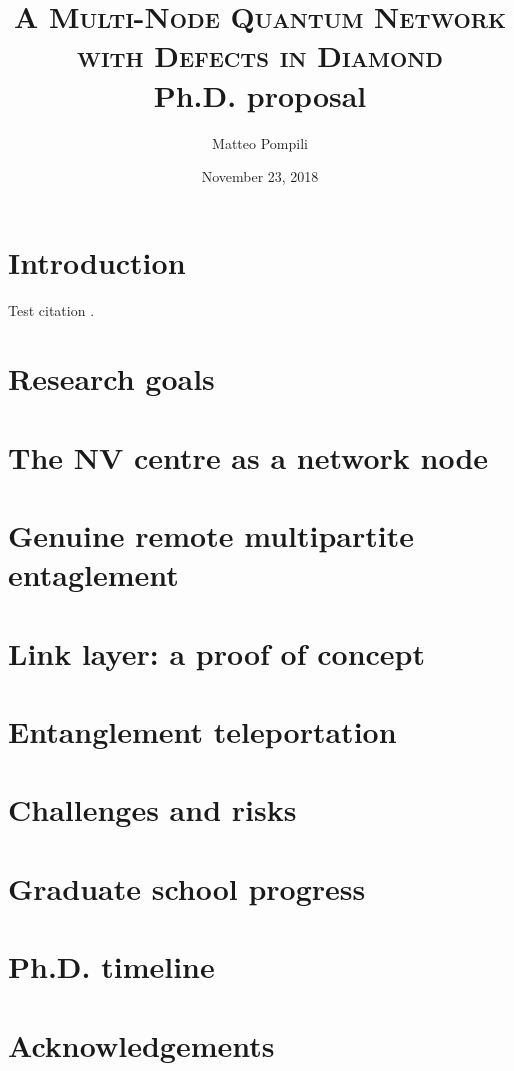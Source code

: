\documentclass[]{article}
\title{
	\huge{\textsc{A Multi-Node Quantum Network \\with Defects in Diamond}}\\
	\vspace{10pt}\Large{Ph.D. proposal}
}
\author{Matteo Pompili}
\date{November 23, 2018}
\begin{document}
\maketitle

\section*{Introduction}
Test citation \cite{Humphreys2018}.

\tableofcontents

\section{Research goals}

\section{The NV centre as a network node}

\section{Genuine remote multipartite entaglement}

\section{Link layer: a proof of concept}

\section{Entanglement teleportation}

\section{Challenges and risks}

\section{Graduate school progress}

\section{Ph.D. timeline}

\section*{Acknowledgements}

\printbibliography[heading=bibintoc]
\end{document}
